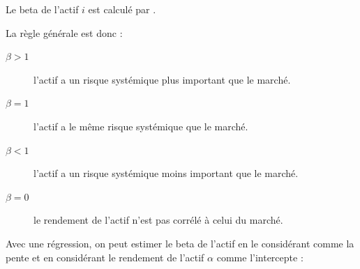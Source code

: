 \documentclass[10pt, french]{article}
\begin{document}
\begin{multicols*}{2}
\begin{definitionNOHFILLsub}
\tcbline

Le beta de l'actif $i$ est calculé par .

La règle générale est donc :
\begin{description}
	\item[$\beta > 1$]	l'actif a un risque systémique plus important que le marché.
	\item[$\beta = 1$]	l'actif a le même risque systémique que le marché.
	\item[$\beta < 1$]	l'actif a un risque systémique moins important que le marché.
	\item[$\beta = 0$]	le rendement de l'actif n'est pas corrélé à celui du marché.
\end{description}
\end{definitionNOHFILLsub}

Avec une régression, on peut estimer le beta de l'actif en le considérant comme la pente et en considérant le rendement de l'actif $\alpha$ comme l'intercepte :
\begin{center}

\begin{tikzpicture}[x=0.75pt,y=0.75pt,yscale=-1,xscale=1]


\end{tikzpicture}
\end{center}
\end{multicols*}
\end{document}
